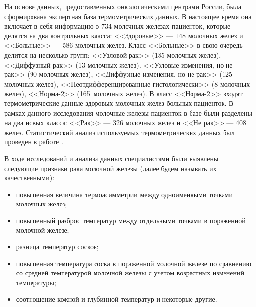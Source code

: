 

На основе данных, предоставленных онкологическими центрами России,
была сформирована экспертная база термометрических данных. В
настоящее время она включает в себя информацию о 734 молочных
железах пациенток, которые делятся на два контрольных класса:
<<Здоровые>> --- 148 молочных желез и <<Больные>> --- 586 молочных
желез. Класс <<Больные>> в свою очередь делится на несколько
групп: <<Узловой рак>> (185 молочных желез), <<Диффузный рак>> (13
молочных желез), <<Узловые изменения, но не рак>> (90 молочных
желез), <<Диффузные изменения, но не рак>> (125 молочных желез),
<<Неотдифференцированные гистологически>> (8 молочных желез),
<<Норма-2>> (165~молочных желез). В класс <<Норма-2>> входят
термометрические данные здоровых молочных желез больных пациенток.
В рамках данного исследования молочные железы пациенток в базе
были разделены на два новых класса: <<Рак>> --- 326 молочных желез и
<<Не рак>> --- 408 желез. Статистический анализ используемых
термометрических данных был проведен в работе \cite{losevmazepa}.



В ходе исследований и анализа данных специалистами были выявлены следующие признаки рака молочной железы \cite{vaysblat,vesnin,losevzamechnik} (далее будем называть их качественными):
\begin{itemize}
    \item повышенная величина термоасимметрии между одноименными точками молочных желез;
    \item повышенный разброс температур между отдельными точками в пораженной молочной железе;
    \item разница температур сосков;
    \item повышенная температура соска в пораженной молочной железе по сравнению со средней температурой молочной железы с учетом возрастных изменений температуры;
    \item соотношение кожной и глубинной температур и некоторые другие.
\end{itemize}

